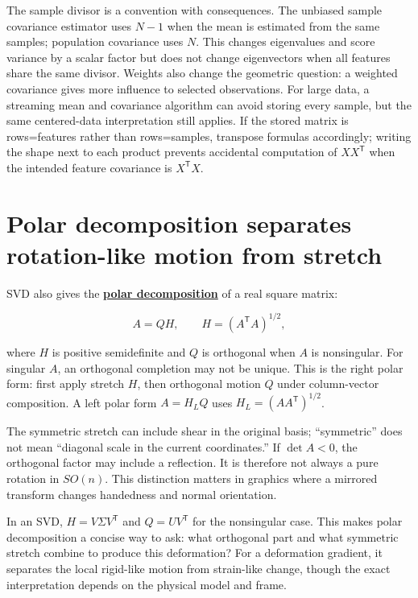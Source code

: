 The sample divisor is a convention with consequences. The unbiased sample covariance estimator uses \(N-1\) when the mean is estimated from the same samples; population covariance uses \(N\). This changes eigenvalues and score variance by a scalar factor but does not change eigenvectors when all features share the same divisor. Weights also change the geometric question: a weighted covariance gives more influence to selected observations. For large data, a streaming mean and covariance algorithm can avoid storing every sample, but the same centered-data interpretation still applies. If the stored matrix is rows=features rather than rows=samples, transpose formulas accordingly; writing the shape next to each product prevents accidental computation of \(XX^\mathsf T\) when the intended feature covariance is \(X^\mathsf TX\).

\section{Polar decomposition separates rotation-like motion from stretch}\label{02-foundations-ii-ch024-polar-decomposition-separates-rotation-like-motion-from-stretch}

SVD also gives the \textbf{\hyperref[02-foundations-ii-ch024-polar-decomposition-separates-frame-dependent-stretch-from-orientation]{polar decomposition}} of a real square matrix:

\[
A=QH,
\qquad H=(A^\mathsf T A)^{1/2},
\]

where \(H\) is positive semidefinite and \(Q\) is orthogonal when \(A\) is nonsingular. For singular \(A\), an orthogonal completion may not be unique. This is the right polar form: first apply stretch \(H\), then orthogonal motion \(Q\) under column-vector composition. A left polar form \(A=H_LQ\) uses \(H_L=(AA^\mathsf T)^{1/2}\).

The symmetric stretch can include shear in the original basis; ``symmetric'' does not mean ``diagonal scale in the current coordinates.'' If \(\det A<0\), the orthogonal factor may include a reflection. It is therefore not always a pure rotation in \(SO(n)\). This distinction matters in graphics where a mirrored transform changes handedness and normal orientation.

In an SVD, \(H=V\Sigma V^\mathsf T\) and \(Q=UV^\mathsf T\) for the nonsingular case. This makes polar decomposition a concise way to ask: what orthogonal part and what symmetric stretch combine to produce this deformation? For a deformation gradient, it separates the local rigid-like motion from strain-like change, though the exact interpretation depends on the physical model and frame.

